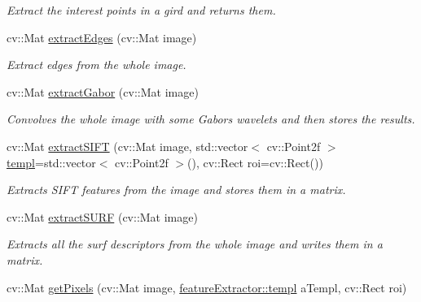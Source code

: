 \begin{DoxyCompactItemize}
\begin{DoxyCompactList}\small\item\em Extract the interest points in a gird and returns them. \item\end{DoxyCompactList}\item 
\hypertarget{classfeatureExtractor_aec0105dc52e7732823e4d0ec18f3bd4d}{
cv::Mat \hyperlink{classfeatureExtractor_aec0105dc52e7732823e4d0ec18f3bd4d}{extractEdges} (cv::Mat image)}
\label{classfeatureExtractor_aec0105dc52e7732823e4d0ec18f3bd4d}

\begin{DoxyCompactList}\small\item\em Extract edges from the whole image. \item\end{DoxyCompactList}\item 
\hypertarget{classfeatureExtractor_adc37c3e97cea5f384a449eb7b5559839}{
cv::Mat \hyperlink{classfeatureExtractor_adc37c3e97cea5f384a449eb7b5559839}{extractGabor} (cv::Mat image)}
\label{classfeatureExtractor_adc37c3e97cea5f384a449eb7b5559839}

\begin{DoxyCompactList}\small\item\em Convolves the whole image with some Gabors wavelets and then stores the results. \item\end{DoxyCompactList}\item 
\hypertarget{classfeatureExtractor_ae5f381eedb74dc92fb98933d9e089272}{
cv::Mat \hyperlink{classfeatureExtractor_ae5f381eedb74dc92fb98933d9e089272}{extractSIFT} (cv::Mat image, std::vector$<$ cv::Point2f $>$ \hyperlink{structfeatureExtractor_1_1templ}{templ}=std::vector$<$ cv::Point2f $>$(), cv::Rect roi=cv::Rect())}
\label{classfeatureExtractor_ae5f381eedb74dc92fb98933d9e089272}

\begin{DoxyCompactList}\small\item\em Extracts SIFT features from the image and stores them in a matrix. \item\end{DoxyCompactList}\item 
\hypertarget{classfeatureExtractor_a169fb2c9c930ef17fb5bbb4838946e29}{
cv::Mat \hyperlink{classfeatureExtractor_a169fb2c9c930ef17fb5bbb4838946e29}{extractSURF} (cv::Mat image)}
\label{classfeatureExtractor_a169fb2c9c930ef17fb5bbb4838946e29}

\begin{DoxyCompactList}\small\item\em Extracts all the surf descriptors from the whole image and writes them in a matrix. \item\end{DoxyCompactList}\item 
\hypertarget{classfeatureExtractor_a845f1866a1c4770e8c749130fc4c4c41}{
cv::Mat \hyperlink{classfeatureExtractor_a845f1866a1c4770e8c749130fc4c4c41}{getPixels} (cv::Mat image, \hyperlink{structfeatureExtractor_1_1templ}{featureExtractor::templ} aTempl, cv::Rect roi)}
\label{classfeatureExtractor_a845f1866a1c4770e8c749130fc4c4c41}


\end{DoxyCompactItemize}
